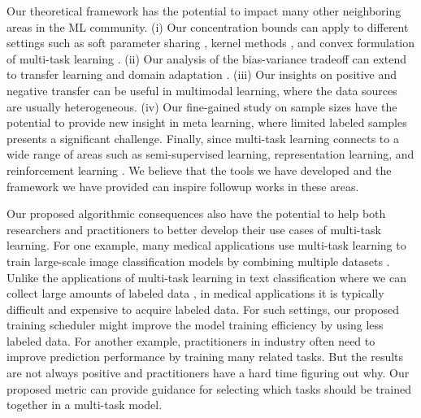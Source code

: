 Our theoretical framework has the potential to impact many other neighboring areas in the ML community.
(i) Our concentration bounds can apply to different settings such as soft parameter sharing \cite{R17} , kernel methods \cite{EMP05}, and convex formulation of multi-task learning \cite{ZY14}.
(ii) Our analysis of the bias-variance tradeoff can extend to transfer learning and domain adaptation \cite{K18}.
(iii) Our insights on positive and negative transfer can be useful in multimodal learning, where the data sources are usually heterogeneous.
(iv) Our fine-gained study on sample sizes have the potential to provide new insight in meta learning, where limited labeled samples presents a significant challenge.
Finally, since multi-task learning connects to a wide range of areas \cite{V20} such as semi-supervised learning, representation learning, and reinforcement learning \cite{YKGLHF20}.%
We believe that the tools we have developed and the framework we have provided can inspire followup works in these areas.

Our proposed algorithmic consequences also have the potential to help both researchers and practitioners to better develop their use cases of multi-task learning.
For one example, many medical applications use multi-task learning to train large-scale image classification models by combining multiple datasets \cite{chexnet17,EA20}.
Unlike the applications of multi-task learning in text classification where we can collect large amounts of labeled data \cite{GLUE}, in medical applications it is typically difficult and expensive to acquire labeled data.
For such settings, our proposed training scheduler might improve the model training efficiency by using less labeled data.
For another example, practitioners in industry often need to improve prediction performance by training many related tasks.
But the results are not always positive and practitioners have a hard time figuring out why.
Our proposed metric can provide guidance for selecting which tasks should be trained together in a multi-task model.







